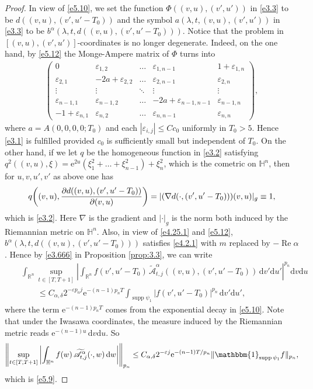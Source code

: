 \documentclass[11pt]{amsproc}
\newcommand{\R}{\mathbb{R}}
\newcommand{\e}{\mathrm{e}}
\newcommand{\indicator}{\mathbbm{1}}
\newcommand{\supp}{\mathop{\mathrm{supp}}}
\newcommand{\0}{\mathbf{0}}
\newcommand{\CK}{\mathscr{A}}
\renewcommand{\Re}{\mathop{\mathrm{Re}}}
\renewcommand{\H}{\mathbb{H}}
\renewcommand{\d}{\mathrm{d}}
\numberwithin{equation}{section}
\numberwithin{figure}{section}
\theoremstyle{definition}
\theoremstyle{remark}
\numberwithin{thm}{section}
\begin{document}
\begin{proof}
In view of \eqref{e5.10}, we set the function $\Phi((v,u),(v',u'))$ in \eqref{e3.3} to be $d((v,u),(v',u'-T_0))$ and the symbol $a(\lambda,t,(v,u),(v',u'))$ in \eqref{e3.3} to be $b^\alpha(\lambda,t,d((v,u),(v',u'-T_0)))$. Notice that the problem in $[(v,u),(v',u')]$-coordinates is no longer degenerate. Indeed, on the one hand, by \eqref{e5.12} the Monge-Ampere matrix of $\Phi$ turns into
\begin{eqnarray*}
\left(\begin{array}{ccccc}
0&\varepsilon_{1,2}&\dots&\varepsilon_{1,n-1}&1+\varepsilon_{1,n}\\
\varepsilon_{2,1}&-2a+\varepsilon_{2,2}&\dots&\varepsilon_{2,n-1}&\varepsilon_{2,n}\\
\vdots&\vdots&\ddots&\vdots&\vdots\\
\varepsilon_{n-1,1}&\varepsilon_{n-1,2}&\dots&-2a+\varepsilon_{n-1,n-1}&\varepsilon_{n-1,n}\\
-1+\varepsilon_{n,1}&\varepsilon_{n,2}&\dots&\varepsilon_{n,n-1}&\varepsilon_{n,n}
\end{array}\right),
\end{eqnarray*}
where $a=A(0,0,0,0;T_0)$ and each $|\varepsilon_{i,j}|\leq Cc_0$ uniformly in $T_0>5$. Hence \eqref{e3.1} is fulfilled provided $c_0$ is sufficiently small but independent of $T_0$. On the other hand, if we let $q$ be the homogeneous function in \eqref{e3.2} satisfying $q^2((v,u),\xi)=\e^{2u}(\xi_1^2+\dots+\xi_{n-1}^2)+\xi_n^2$, which is the cometric on $\H^n$, then for $u,v,u',v'$ as above one has
\begin{eqnarray*}
q\!\left((v,u),{\partial d((v,u),(v',u'-T_0))\over\partial (v,u)}\right)=|(\nabla d(\cdot,(v',u'-T_0)))(v,u)|_g\equiv 1,
\end{eqnarray*}
which is \eqref{e3.2}. Here $\nabla$ is the gradient and $|\cdot|_g$ is the norm both induced by the Riemannian metric on $\H^n$. Also, in view of \eqref{e4.25.1} and \eqref{e5.12}, $b^\alpha(\lambda,t,d((v,u),(v',u'-T_0)))$ satisfies \eqref{e4.2.1} with $m$ replaced by $-\Re\alpha$. Hence by \eqref{e3.666} in Proposition \ref{prop:3.3}, we can write
\begin{eqnarray*}
&&\int_{\R^n}\sup_{t\in[T,T+1]}\left|\int_{\R^n}f(v',u'-T_0)\,\widetilde{\CK}^\alpha_{t,j}((v,u),(v',u'-T_0))\,\d v'\d u'\right|^{p_n}\d v\d u\\
&&\qquad\leq C_{\alpha,\delta}2^{-\varepsilon p_nj}\e^{-(n-1)p_nT}\int_{\supp \psi_1}|f(v',u'-T_0)|^{p_n}\,\d v'\d u',
\end{eqnarray*}
where the term $\e^{-(n-1)p_nT}$ comes from the exponential decay in \eqref{e5.10}. Note that under the Iwasawa coordinates, the measure induced by the Riemannian metric reads $\e^{-(n-1)u}\,\d v\d u$. So
\begin{eqnarray*}
\left\|\sup_{t\in[T,T+1]}\left|\int_{\H^n}f(w)\,\widetilde{\CK}^\alpha_{t,j}(\cdot,w)\,\d w\right|\right\|_{p_n}\leq C_{\alpha,\delta}2^{-\varepsilon j}\e^{-(n-1)T/p_n}\|\indicator_{\supp \psi_1}f\|_{p_n},
\end{eqnarray*}
which is \eqref{e5.9}.
\end{proof}
\end{document}
